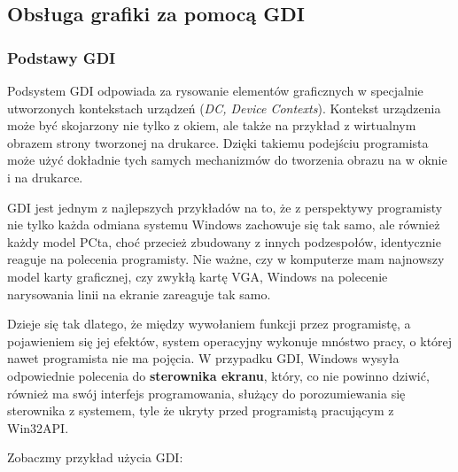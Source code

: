 ﻿\subsection{Obsługa grafiki za pomocą GDI}
\label{subsection_gdi}

\subsubsection{Podstawy GDI}

Podsystem GDI odpowiada za rysowanie elementów graficznych w specjalnie utworzonych
kontekstach urządzeń ({\em DC, Device Contexts}). 
Kontekst urządzenia może być skojarzony nie tylko z okiem, ale
także na przykład z wirtualnym obrazem strony tworzonej na drukarce. Dzięki takiemu podejściu
programista może użyć dokładnie tych samych mechanizmów do tworzenia obrazu na w oknie i na drukarce.

GDI jest jednym z najlepszych przykładów na to, że z perspektywy programisty nie tylko każda
odmiana systemu Windows zachowuje się tak samo, ale również każdy model PCta, choć przecież
zbudowany z innych podzespołów, identycznie reaguje na polecenia programisty. Nie ważne, czy
w komputerze mam najnowszy model karty graficznej, czy zwykłą kartę VGA, Windows na polecenie
narysowania linii na ekranie zareaguje tak samo.

Dzieje się tak dlatego, że między wywołaniem funkcji przez programistę, a pojawieniem się jej
efektów, system operacyjny wykonuje mnóstwo pracy, o której nawet programista nie ma pojęcia. W przypadku
GDI, Windows wysyła odpowiednie polecenia do {\bf sterownika ekranu}, który, co nie powinno dziwić, również
ma swój interfejs programowania, służący do porozumiewania się sterownika z systemem, tyle że ukryty
przed programistą pracującym z Win32API.

Zobaczmy przykład użycia GDI:

